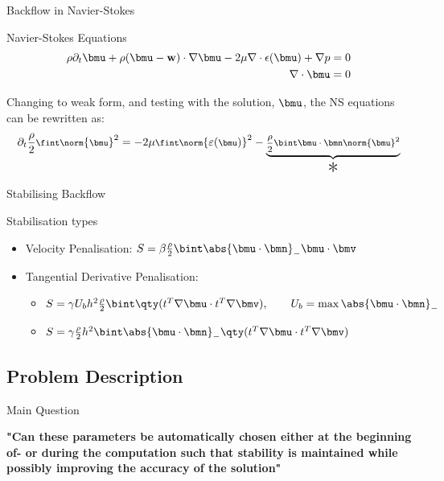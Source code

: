 \begin{frame}{Backflow in Navier-Stokes}

\begin{block}{Navier-Stokes Equations}
\[\begin{aligned}
 \rho\partial_t\bmu + \rho(\bmu - \textbf{w})\cdot\nabla\bmu - 2\mu\nabla\cdot\epsilon(\bmu) + \nabla p &= 0 \\ \nabla\cdot\bmu &= 0 
\end{aligned}\]
\end{block}

Changing to weak form, and testing with the solution, \(\bmu\), the NS equations can be rewritten as:
\[\footnotesize
\partial_t\frac{\rho}{2}\fint\norm{\bmu}^2 = -2\mu \fint \norm{\varepsilon(\bmu)}^2 - \underbrace{\frac{\rho}{2}\bint\bmu\cdot\bmn\norm{\bmu}^2}_{\text{\huge \textasteriskcentered}}
\]


\end{frame}
\begin{frame}{Stabilising Backflow}
  
  \begin{block}{Stabilisation types}
  \begin{itemize}
      \item Velocity Penalisation:
      \(
      S = \beta\frac{\rho}{2}\bint \abs{\bmu \cdot \bmn }_- \bmu \cdot \bmv
      \)
      \item Tangential Derivative Penalisation:
      \begin{itemize}
          \item  \(      S = \gamma U_b h^2 \frac{\rho}{2} \bint \qty(t^{T}\nabla\bmu \cdot t^{T}\nabla\bmv), \qquad U_b = \max \abs{\bmu \cdot \bmn}_-\)
      \item \(
      S = \gamma\frac{\rho}{2}h^{2}\bint \abs{\bmu \cdot \bmn }_- \qty(t^{T}\nabla\bmu \cdot t^{T}\nabla\bmv)
      \)
      \end{itemize}
     
  \end{itemize}
      
  \end{block}
\end{frame}
\subsection{Problem Description}
\begin{frame}{Main Question}
\begin{center}
    \textbf{"Can these parameters be automatically chosen either at the beginning of- or during the computation such that stability is maintained while possibly improving the accuracy of the solution"}
\end{center}
\end{frame}